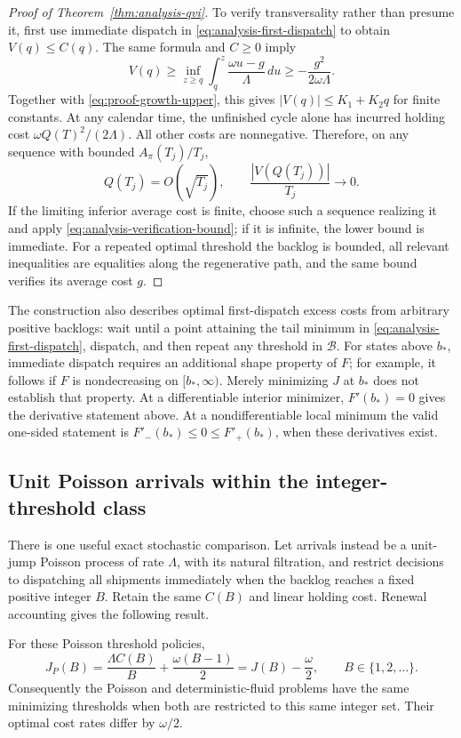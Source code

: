 \begin{proof}[Proof of Theorem~\ref{thm:analysis-qvi}]
To verify transversality rather than presume it, first use immediate
dispatch in \eqref{eq:analysis-first-dispatch} to obtain $V(q)\le C(q)$.
The same formula and $C\ge0$ imply
\[
 V(q)\ge \inf_{z\ge q}
      \int_q^z\frac{\omega u-g}{\Lambda}\,du
      \ge-\frac{g^2}{2\omega\Lambda}.
\]
Together with \eqref{eq:proof-growth-upper}, this gives
$|V(q)|\le K_1+K_2q$ for finite constants. At any calendar time, the
unfinished cycle alone has incurred holding cost
$\omega Q(T)^2/(2\Lambda)$. All other costs are nonnegative. Therefore,
on any sequence with bounded $A_\pi(T_j)/T_j$,
\[
 Q(T_j)=O(\sqrt{T_j}),\qquad
 \frac{|V(Q(T_j))|}{T_j}\longrightarrow0.
\]
If the limiting inferior average cost is finite, choose such a sequence
realizing it and apply \eqref{eq:analysis-verification-bound}; if it is
infinite, the lower bound is immediate. For a repeated optimal threshold
the backlog is bounded, all relevant inequalities are equalities along
the regenerative path, and the same bound verifies its average cost $g$.
\end{proof}

The construction also describes optimal first-dispatch excess costs from
arbitrary positive backlogs: wait until a point attaining the tail minimum
in \eqref{eq:analysis-first-dispatch}, dispatch, and then repeat any
threshold in $\mathcal B$. For states above $b_*$, immediate dispatch
requires an additional shape property of $F$; for example, it follows if
$F$ is nondecreasing on $[b_*,\infty)$. Merely minimizing $J$ at $b_*$
does not establish that property. At a differentiable interior minimizer,
$F'(b_*)=0$ gives the derivative statement above. At a
nondifferentiable local minimum the valid one-sided statement is
$F'_-(b_*)\le0\le F'_+(b_*)$, when these derivatives exist.

\subsection{Unit Poisson arrivals within the integer-threshold class}
\label{subsec:analysis-limits}

There is one useful exact stochastic comparison. Let arrivals instead be a
unit-jump Poisson process of rate $\Lambda$, with its natural filtration,
and restrict decisions to dispatching all shipments immediately when the
backlog reaches a fixed positive integer $B$. Retain the same $C(B)$ and
linear holding cost. Renewal accounting gives the following result.

\begin{proposition}
\label{prop:analysis-poisson}
For these Poisson threshold policies,
\begin{equation}
 J_P(B)=\frac{\Lambda C(B)}B+\frac{\omega(B-1)}2
       =J(B)-\frac\omega2,\qquad B\in\{1,2,\ldots\}.
 \label{eq:analysis-poisson}
\end{equation}
Consequently the Poisson and deterministic-fluid problems have the same
minimizing thresholds when both are restricted to this same integer set.
Their optimal cost rates differ by $\omega/2$.
\end{proposition}

